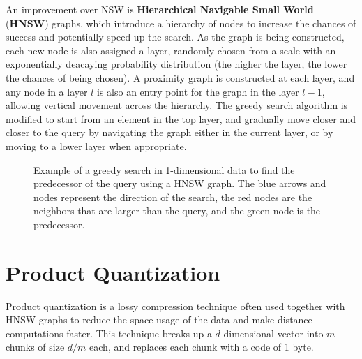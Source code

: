 An improvement over NSW is \textbf{Hierarchical Navigable Small World} (\textbf{HNSW}) graphs, which introduce a hierarchy of nodes to increase the chances of success and potentially speed up the search. As the graph is being constructed, each new node is also assigned a layer, randomly chosen from a scale with an exponentially deacaying probability distribution (the higher the layer, the lower the chances of being chosen). A proximity graph is constructed at each layer, and any node in a layer $l$ is also an entry point for the graph in the layer $l-1$, allowing vertical movement across the hierarchy. The greedy search algorithm is modified to start from an element in the top layer, and gradually move closer and closer to the query by navigating the graph either in the current layer, or by moving to a lower layer when appropriate.
\begin{figure}[h]
    \centering
    
    \caption{Example of a greedy search in 1-dimensional data to find the predecessor of the query using a HNSW graph. The blue arrows and nodes represent the direction of the search, the red nodes are the neighbors that are larger than the query, and the green node is the predecessor.}
\end{figure}

\section{Product Quantization}

Product quantization is a lossy compression technique often used together with HNSW graphs to reduce the space usage of the data and make distance computations faster. This technique breaks up a $d$-dimensional vector into $m$ chunks of size $d/m$ each, and replaces each chunk with a code of 1 byte. 
